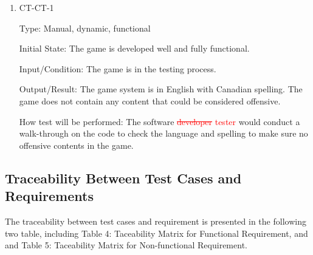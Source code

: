 \documentclass[12pt, titlepage]{article}
\begin{document}
\begin{enumerate}

\item{CT-CT-1\\}

Type: Manual, dynamic, functional
					
Initial State: The game is developed well and fully functional.
					
Input/Condition: The game is in the testing process.
					
Output/Result: The game system is in English with Canadian spelling. The game does not contain any content that could be considered offensive.
					
How test will be performed: The software  \textcolor{red}{\sout{developer} tester} would conduct a walk-through on the code to check the language and spelling to make sure no offensive contents in the game.

\end{enumerate}
\newpage
\subsection{Traceability Between Test Cases and Requirements}

The traceability between test cases and requirement is presented in the following two table, including Table 4: Taceability Matrix for Functional Requirement, and and Table 5: Taceability Matrix for Non-functional Requirement.
\end{document}

